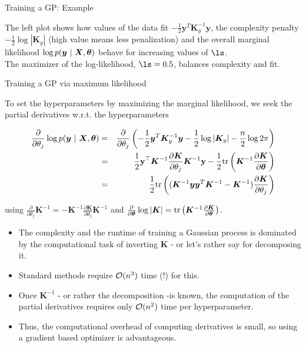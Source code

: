 \documentclass[11pt,compress,t,notes=noshow, xcolor=table]{beamer}
\begin{document}
\begin{vbframe}{Training a GP: Example}
\begin{footnotesize}
	The left plot shows how values of the data fit $-\frac{1}{2}\bm{y}^T\bm{K}_y^{-1} \bm{y}$, the complexity penalty $- \frac{1}{2} \log \left| \bm{K}_y \right|$ (high value means less penalization) and the overall marginal likelihood $\log p(\bm{y} ~|~ \bm{X}, \bm{\theta})$ behave for increasing values of $\ls$.\\ 
	The maximizer of the log-likelihood, $\ls = 0.5$, balances complexity and fit. 
\end{footnotesize}


\end{vbframe}

\begin{vbframe}{Training a GP via maximum likelihood}

To set the hyperparameters by maximizing the marginal likelihood, we seek the partial derivatives w.r.t. the hyperparameters

\begin{footnotesize}
\begin{eqnarray*}
\frac{\partial}{\partial\theta_j} \log p(\bm{y} ~|~ \bm{X}, \bm{\theta}) &=& \frac{\partial}{\partial\theta_j}  \left(-\frac{1}{2}\bm{y}^T\bm{K}_y^{-1} \bm{y} - \frac{1}{2} \log \left| \bm{K}_y \right| - \frac{n}{2} \log 2\pi\right) \\ 
&=&\frac{1}{2} \mathbf{y}^\top \bm{K}^{-1} \frac{\partial \bm{K}}{\partial \theta_j}\bm{K}^{-1} \mathbf{y} - \frac{1}{2} \text{tr}\left(\bm{K}^{-1} \frac{\partial \bm{K}}{\partial \bm{\theta}} \right) \\
&=& \frac{1}{2} \text{tr}\left((\bm{K}^{-1}\bm{y}\bm{y}^T\bm{K}^{-1} - \bm{K}^{-1})\frac{\partial\bm{K}}{\partial\theta_j}\right)
\end{eqnarray*}
\end{footnotesize}

using $\frac{\partial}{\partial \theta_j} \bm{K}^{-1} = - \bm{K}^{-1} \frac{\partial \bm{K}}{\partial \theta_j}\bm{K}^{-1}$ and $\frac{\partial}{\partial \bm{\theta}} \log  |\bm{K}| = \text{tr}\left(\bm{K}^{-1} \frac{\partial \bm{K}}{\partial \bm{\theta}} \right)$. 

\framebreak

\begin{itemize}
  \item The complexity and the runtime of training a Gaussian process is dominated by the computational task of inverting $\bm{K}$ - or let's rather say for decomposing it.
  \item Standard methods require $\mathcal{O}(n^3)$ time (!) for this.
  \item Once $\bm{K}^{-1}$ - or rather the decomposition -is known, the computation of the partial derivatives requires only $\mathcal{O}(n^2)$ time per hyperparameter.
  \item  Thus, the computational overhead of computing derivatives is small, so using a gradient based optimizer is advantageous. 
\end{itemize} 



\end{vbframe}
\end{document}
